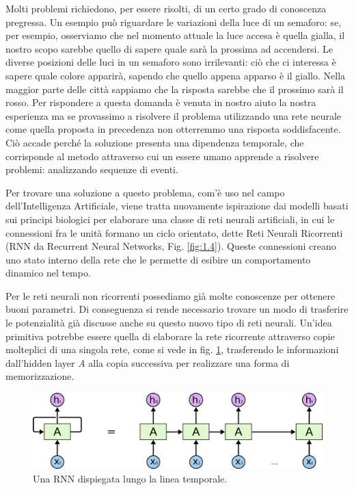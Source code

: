 Molti problemi richiedono, per essere risolti, di un certo grado di conoscenza pregressa. Un esempio può riguardare le variazioni della luce di un semaforo: se, per esempio, osserviamo che nel momento attuale la luce accesa è quella gialla, il nostro scopo sarebbe quello di sapere quale sarà la prossima ad accendersi. Le diverse posizioni delle luci in un semaforo sono irrilevanti: ciò che ci interessa è sapere quale colore apparirà, sapendo che quello appena apparso è il giallo. Nella maggior parte delle città sappiamo che la risposta sarebbe che il prossimo sarà il rosso. Per rispondere a questa domanda è venuta in nostro aiuto la nostra esperienza ma se provassimo a risolvere il problema utilizzando una rete neurale come quella proposta in precedenza non otterremmo una risposta soddisfacente. Ciò accade perché la soluzione presenta una dipendenza temporale, che corrisponde al metodo attraverso cui un essere umano apprende a risolvere problemi: analizzando sequenze di eventi.

Per trovare una soluzione a questo problema, com'è uso nel campo dell'Intelligenza Artificiale, viene tratta nuovamente ispirazione dai modelli basati sui principi biologici per elaborare una classe di reti neurali artificiali, in cui le connessioni fra le unità formano un ciclo orientato, dette Reti Neurali Ricorrenti (RNN da Recurrent Neural Networks, Fig. \ref{fig:1.4}). Queste connessioni creano uno stato interno della rete che le permette di esibire un comportamento dinamico nel tempo.

Per le reti neurali non ricorrenti possediamo già molte conoscenze per ottenere buoni parametri. Di conseguenza si rende necessario trovare un modo di trasferire le potenzialità già discusse anche su questo nuovo tipo di reti neurali. Un'idea primitiva potrebbe essere quella di elaborare la rete ricorrente attraverso copie molteplici di una singola rete, come si vede in fig. \ref{fig:1.5}, trasferendo le informazioni dall'hidden layer \textit{A} alla copia successiva per realizzare una forma di memorizzazione.

\begin{figure}[h]
	\centering
	\includegraphics{img/unrolled_rnn.png}
	\caption{Una RNN dispiegata lungo la linea temporale.}
	\label{fig:1.5}
\end{figure}

